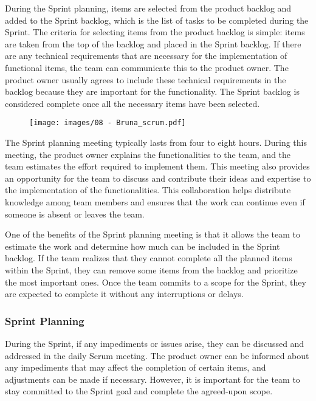 During the Sprint planning, items are selected from the product backlog
and added to the Sprint backlog, which is the list of tasks to be
completed during the Sprint. The criteria for selecting items from the
product backlog is simple: items are taken from the top of the backlog
and placed in the Sprint backlog. If there are any technical
requirements that are necessary for the implementation of functional
items, the team can communicate this to the product owner. The product
owner usually agrees to include these technical requirements in the
backlog because they are important for the functionality. The Sprint
backlog is considered complete once all the necessary items have been
selected.

\begin{figure}[!h]
  \centering
  \texttt{[image: images/08 - Bruna\_scrum.pdf]}
\end{figure}

The Sprint planning meeting typically lasts from four to eight hours.
During this meeting, the product owner explains the functionalities to
the team, and the team estimates the effort required to implement them.
This meeting also provides an opportunity for the team to discuss and
contribute their ideas and expertise to the implementation of the
functionalities. This collaboration helps distribute knowledge among
team members and ensures that the work can continue even if someone is
absent or leaves the team.

One of the benefits of the Sprint planning meeting is that it allows the
team to estimate the work and determine how much can be included in the
Sprint backlog. If the team realizes that they cannot complete all the
planned items within the Sprint, they can remove some items from the
backlog and prioritize the most important ones. Once the team commits to
a scope for the Sprint, they are expected to complete it without any
interruptions or delays.

\subsubsection{Sprint Planning}

During the Sprint, if any impediments or issues arise, they can be
discussed and addressed in the daily Scrum meeting. The product owner
can be informed about any impediments that may affect the completion of
certain items, and adjustments can be made if necessary. However, it is
important for the team to stay committed to the Sprint goal and complete
the agreed-upon scope.

